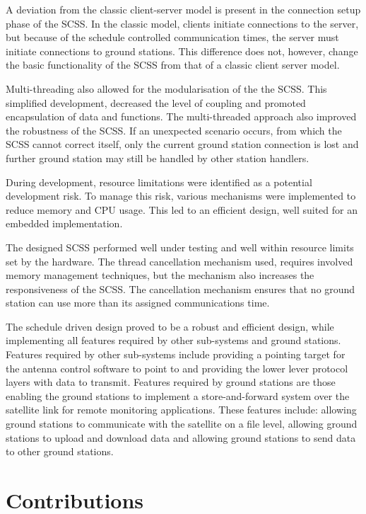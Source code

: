 A deviation from the classic client-server model is present in the connection setup phase 
of the SCSS. In the classic model, clients initiate connections to the server, but
because of the schedule controlled communication times, the server must initiate connections
to ground stations. This difference does not, however, change the basic functionality of the
SCSS from that of a classic client server model.

Multi-threading also allowed for the modularisation of the the SCSS. This simplified development,
decreased the level of coupling and promoted encapsulation of data and functions. The multi-threaded
approach also improved the robustness of the SCSS. If an unexpected scenario occurs, from
which the SCSS cannot correct itself, only the current ground station connection is lost and
further ground station may still be handled by other station handlers.

During development, resource limitations were identified as a potential development risk. To
manage this risk, various mechanisms were implemented to reduce memory and CPU usage.
This led to an efficient design, well suited for an embedded implementation.

The designed SCSS performed well under testing and well within resource limits
set by the hardware. The thread cancellation mechanism used, requires involved memory
management techniques, but the mechanism also increases the responsiveness of the SCSS.
The cancellation mechanism ensures that no ground station can use more than its assigned
communications time.

The schedule driven design proved to be a robust and efficient design, while implementing
all features required by other sub-systems and ground stations. Features required by other
sub-systems include providing a pointing target for the antenna control software to point to
and providing the lower lever protocol layers with data to transmit. Features required by
ground stations are those enabling the ground stations to implement a store-and-forward
system over the satellite link for remote monitoring applications. These features include:
allowing ground stations to communicate with the satellite on a file level, allowing ground
stations to upload and download data and allowing ground stations to send data to other
ground stations.

\section{Contributions}
\label{contributions}

